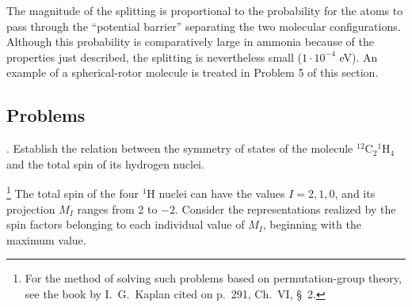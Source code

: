 \setcounter{figure}{43}
\begin{figure}[ht]
\centering
{}
\caption{}
\end{figure}

The magnitude of the splitting is proportional to the probability for the atoms to pass through the ``potential barrier'' separating the two molecular configurations. Although this probability is comparatively large in ammonia because of the properties just described, the splitting is nevertheless small ($1\cdot10^{-4}$ eV). An example of a spherical-rotor molecule is treated in Problem 5 of this section.

\subsection*{Problems}

. Establish the relation between the symmetry of states of the molecule ${}^{12}\mathrm C_2{}^1\mathrm H_4$ and the total spin of its hydrogen nuclei.

\SolutionHeading\footnote{For the method of solving such problems based on permutation-group theory, see the book by I.~G.~Kaplan cited on p.~291, Ch.~VI, \S~2.} The total spin of the four ${}^1\mathrm H$ nuclei can have the values $I=2,1,0$, and its projection $M_I$ ranges from 2 to $-2$. Consider the representations realized by the spin factors belonging to each individual value of $M_I$, beginning with the maximum value.

